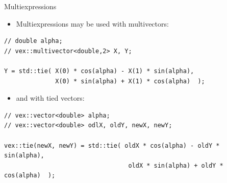 \documentclass[@BEAMER_OPTIONS@]{beamer}
\begin{document}
\begin{frame}[fragile]{Multiexpressions}
    \begin{itemize}
        \item Multiexpressions may be used with multivectors:
    \end{itemize}
    \begin{exampleblock}{}
        \begin{lstlisting}
// double alpha;
// vex::multivector<double,2> X, Y;

Y = std::tie( X(0) * cos(alpha) - X(1) * sin(alpha),
              X(0) * sin(alpha) + X(1) * cos(alpha)  );
        \end{lstlisting}
    \end{exampleblock}
    \begin{itemize}
        \item and with tied vectors:
    \end{itemize}
    \begin{exampleblock}{}
        \begin{lstlisting}
// vex::vector<double> alpha;
// vex::vector<double> odlX, oldY, newX, newY;

vex::tie(newX, newY) = std::tie( oldX * cos(alpha) - oldY * sin(alpha),
                                  oldX * sin(alpha) + oldY * cos(alpha)  );
        \end{lstlisting}
    \end{exampleblock}
\end{frame}

\end{document}
